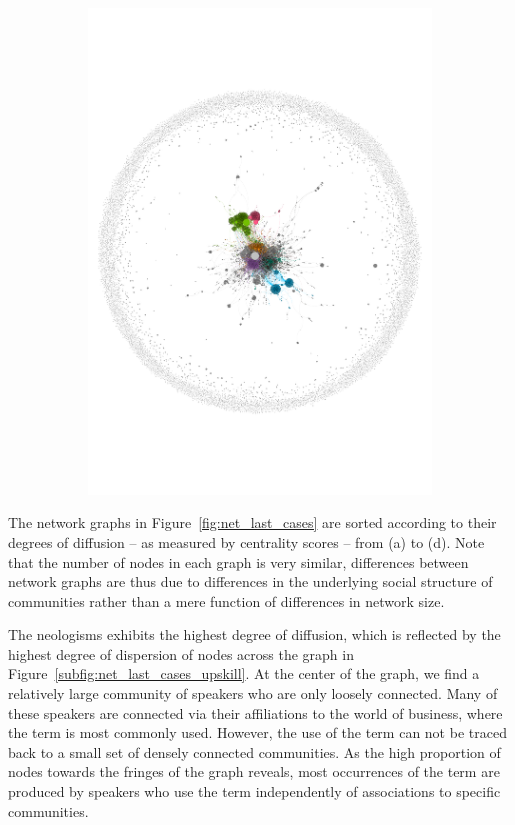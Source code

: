 \documentclass[
  a4paper,
  abstract=on,
  captions=tableabove
  ]{scrartcl}
\begin{document}
\begin{figure}
\begin{subfigure}{.45\linewidth}
          \includegraphics[width=\linewidth, height=\textheight, keepaspectratio]{img/net_solopreneur_four.pdf}
        \end{subfigure}
      \end{figure}

      The network graphs in Figure~\ref{fig:net_last_cases} are sorted according to their degrees of diffusion -- as measured by centrality scores -- from (a) to (d). Note that the number of nodes in each graph is very similar, differences between network graphs are thus due to differences in the underlying social structure of communities rather than a mere function of differences in network size.

      The neologisms  exhibits the highest degree of diffusion, which is reflected by the highest degree of dispersion of nodes across the graph in Figure~\ref{subfig:net_last_cases_upskill}. At the center of the graph, we find a relatively large community of speakers who are only loosely connected. Many of these speakers are connected via their affiliations to the world of business, where the term  is most commonly used. However, the use of the term can not be traced back to a small set of densely connected communities. As the high proportion of nodes towards the fringes of the graph reveals, most occurrences of the term are produced by speakers who use the term independently of associations to specific communities. 
\end{document}
